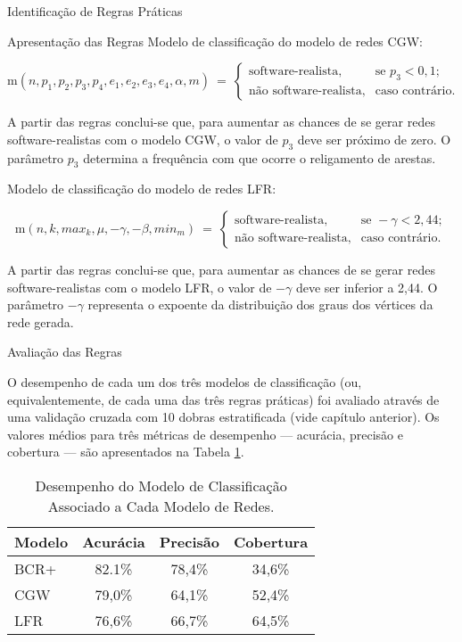 \begin{section}{Identificação de Regras Práticas}
\begin{subsection}{Apresentação das Regras}
	Modelo de classificação do modelo de redes CGW:
	
	$$
	\mathrm{m}(n, p_1, p_2, p_3, p_4, e_1, e_2, e_3, e_4, \alpha, m) ~=~
	\left\{
	\begin{array}{cl}
	\mbox{software-realista,} & \mbox{se } p_3 < 0,1; \\
	\mbox{não software-realista,} & \mbox{caso contrário.}
	\end{array}
	\right.
	$$
	
		A partir das regras conclui-se que, para aumentar as chances de se gerar redes software-realistas com o modelo CGW, o valor de $p_3$ deve ser próximo de zero. O parâmetro $p_3$ determina a frequência com que ocorre o religamento de arestas. 
	
	Modelo de classificação do modelo de redes LFR:

	$$
	\mathrm{m}(n, k, max_k, \mu, -\gamma, -\beta, min_m) ~=~
	\left\{
	\begin{array}{cl}
	\mbox{software-realista,} & \mbox{se } -\gamma < 2,44; \\
	\mbox{não software-realista,} & \mbox{caso contrário.}
	\end{array}
	\right.
	$$
	
	A partir das regras conclui-se que, para aumentar as chances de se gerar redes software-realistas com o modelo LFR, o valor de $-\gamma$ deve ser inferior a 2,44. O parâmetro $-\gamma$ representa o expoente da distribuição dos graus dos vértices da rede gerada.
	
\end{subsection}
	
\begin{subsection}{Avaliação das Regras}
	
\end{subsection}
	O desempenho de cada um dos três modelos de classificação (ou, equivalentemente, de cada uma das três regras práticas) foi avaliado através de uma validação cruzada com 10 dobras estratificada (vide capítulo anterior). Os valores médios para três métricas de desempenho --- acurácia, precisão e cobertura --- são apresentados na Tabela \ref{tab:rules}.
	
	\begin{table}
	\caption{Desempenho do Modelo de Classificação Associado a Cada Modelo de Redes.}
	\centering
	\begin{tabular}{|l|c|c|c|}
	\hline
	\textbf{Modelo} & \textbf{Acurácia} & \textbf{Precisão} & \textbf{Cobertura} \\
	\hline 
	\hline
	BCR+ &  82.1\%  &  78,4\%  &  34,6\% \\
	CGW  &  79,0\%  &  64,1\%  &  52,4\% \\
	LFR  &  76,6\%  &  66,7\%  &  64,5\% \\
	\hline
	\end{tabular}
	\label{tab:rules}
	\end{table}


\end{section}
